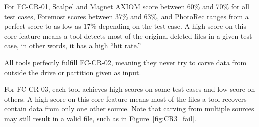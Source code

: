

For FC-CR-01, Scalpel and Magnet AXIOM score between 60\% and 70\% for all test cases, Foremost scores between 37\% and 63\%, and PhotoRec ranges from a perfect score to as low as 17\% depending on the test case.
A high score on this core feature means a tool detects most of the original deleted files in a given test case, in other words, it has a high ``hit rate.''

All tools perfectly fulfill FC-CR-02, meaning they never try to carve data from outside the drive or partition given as input.

For FC-CR-03, each tool achieves high scores on some test cases and low score on others.
A high score on this core feature means most of the files a tool recovers contain data from only one other source.
Note that carving from multiple sources may still result in a valid file, such as in Figure~\ref{fig:CR3_fail}.


